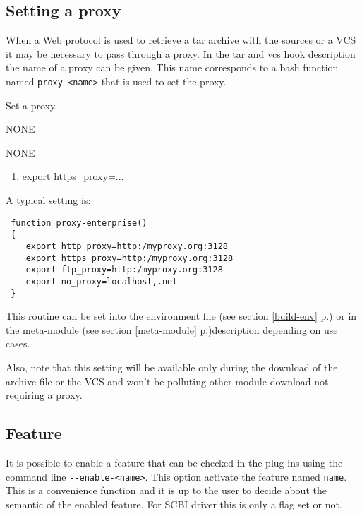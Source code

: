 \documentclass[a4paper,12pt,twoside]{article}
\newcommand{\code}[1]{\texttt{#1}}
\newcommand{\seeref}[1]{see section \ref{#1} p.\pageref{#1}}
\newcommand{\ddash}{-{}-}
\begin{document}
\subsection{Setting a proxy}
\label{proxy}

When a Web protocol is used to retrieve a tar archive with the sources or a VCS it may be necessary to pass through a proxy. In the tar and vcs hook description the name of a proxy can be given. This name corresponds to a bash function named \code{proxy-<name>} that is used to set the proxy.

\begin{description}[style=nextline]
	\item[proxy-<name>] Set a proxy.
	\begin{description}[font=\textit,style=standard]
		\item[parameter] \tabto{2cm} NONE
		\item[return] \tabto{2cm} NONE
		\begin{enumerate}
			\item export https\_proxy=...
		\end{enumerate}
	\end{description}
\end{description}

A typical setting is:

\begin{lstlisting}
 function proxy-enterprise()
 {
    export http_proxy=http:/myproxy.org:3128
    export https_proxy=http:/myproxy.org:3128
    export ftp_proxy=http:/myproxy.org:3128
    export no_proxy=localhost,.net
 }
\end{lstlisting}

This routine can be set into the environment file (\seeref{build-env}) or in the meta-module (\seeref{meta-module})description depending on use cases.

Also, note that this setting will be available only during the download of the archive file or the VCS and won't be polluting other module download not requiring a proxy.

\subsection{Feature}
\label{enable-feature}

It is possible to enable a feature that can be checked in the plug-ins using the command line \code{\ddash{}enable-<name>}. This option activate the feature named \code{name}. This is a convenience function and it is up to the user to decide about the semantic of the enabled feature. For SCBI driver this is only a flag set or not.
\end{document}
